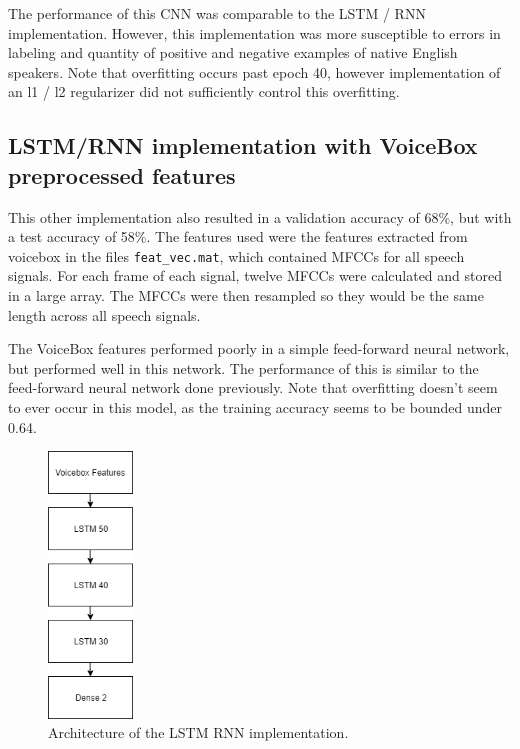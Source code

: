 \documentclass{article}
\begin{document}
The performance of this CNN was comparable to the LSTM / RNN implementation.
However, this implementation was more susceptible to errors in labeling and quantity of positive and negative examples of native English speakers.
Note that overfitting occurs past epoch 40, however implementation of an  l1 / l2 regularizer did not sufficiently control this overfitting.

\subsection{LSTM/RNN implementation with VoiceBox preprocessed features}
\label{subsec:rnn}

This other implementation also resulted in a validation accuracy of 68\%, but with a test accuracy of 58\%.
The features used were the features extracted from voicebox in the files \texttt{feat\_vec.mat}, which contained MFCCs for all speech signals.
For each frame of each signal, twelve MFCCs were calculated and stored in a large array.
The MFCCs were then resampled so they would be the same length across all speech signals.

The VoiceBox features performed poorly in a simple feed-forward neural network, but performed well in this network.
The performance of this is similar to the feed-forward neural network done previously.
Note that overfitting doesn’t seem to ever occur in this model, as the training accuracy seems to be bounded under 0.64.

\begin{figure}[htb]
	\centering
	\includegraphics[width = 2.25cm]{figs/rnn_architecture}
	\caption{Architecture of the LSTM RNN implementation.}
	\label{fig:rnn_architecture}
\end{figure}
\end{document}
